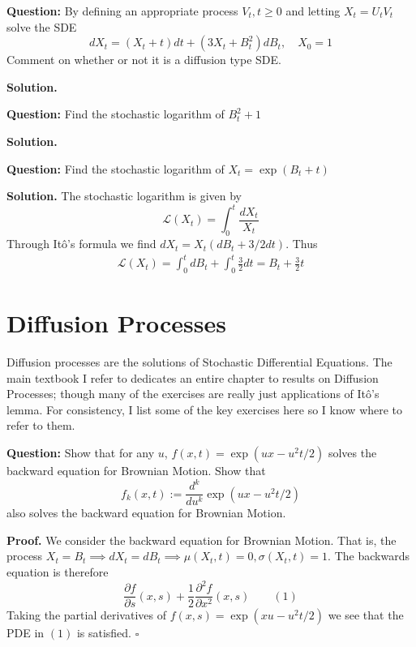 \documentclass{article}
\begin{document}
\begin{tcolorbox}[colframe=black,colback=gray!5,boxrule=0.5pt]
\textbf{Question:} By defining an appropriate process $V_t, t\geq0$ and letting $X_t = U_tV_t$ solve the SDE
$$dX_t = (X_t+t)dt + (3X_t+B_t^2)dB_t, \quad X_0=1$$
Comment on whether or not it is a diffusion type SDE. 
\end{tcolorbox}
\textbf{Solution.}

\begin{tcolorbox}[colframe=black,colback=gray!5,boxrule=0.5pt]
\textbf{Question:} Find the stochastic logarithm of $B_t^2+1$
\end{tcolorbox}
\textbf{Solution.}

\begin{tcolorbox}[colframe=black,colback=gray!5,boxrule=0.5pt]
\textbf{Question:} Find the stochastic logarithm of $X_t = \exp(B_t + t)$
\end{tcolorbox}
\textbf{Solution.} The stochastic logarithm is given by 
$$\mathcal{L}(X_t) = \int_0^t \frac{dX_t}{X_t}$$
Through Itô's formula we find $dX_t = X_t(dB_t + 3/2dt)$. Thus 
\begin{align*}
    \mathcal{L}(X_t) = \int_0^tdB_t + \int_0^t\frac{3}{2}dt = B_t + \frac{3}{2}t
\end{align*}

\newpage
\section{Diffusion Processes}

Diffusion processes are the solutions of Stochastic Differential Equations. The main textbook I refer to \cite{Fima} dedicates an entire chapter to results on Diffusion Processes; though many of the exercises are really just applications of Itô's lemma. For consistency, I list some of the key exercises here so I know where to refer to them.

\begin{tcolorbox}[colframe=black,colback=gray!5,boxrule=0.5pt]
\textbf{Question:} Show that for any $u$, $f(x,t) = \exp(ux-u^2t/2)$ solves the backward equation for Brownian Motion. Show that 
$$f_k(x,t) := \frac{d^k}{du^k}\exp(ux-u^2t/2)$$
also solves the backward equation for Brownian Motion.
\end{tcolorbox}
\textbf{Proof.} We consider the backward equation for Brownian Motion. That is, the process $X_t = B_t\implies dX_t=dB_t\implies\mu(X_t,t)=0,\sigma(X_t,t)=1$. The backwards equation is therefore
$$\frac{\partial f}{\partial s}(x,s) + \frac{1}{2}\frac{\partial^2 f}{\partial x^2}(x,s) \quad\quad (1)$$
Taking the partial derivatives of $f(x,s) = \exp(xu - u^2t/2)$ we see that the PDE in $(1)$ is satisfied. $\square$
\end{document}
